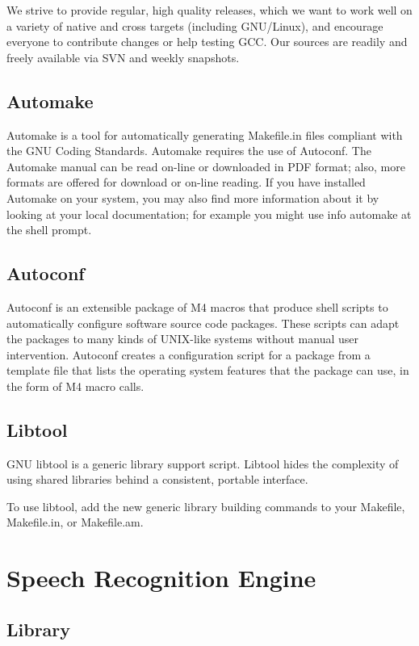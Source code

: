 \documentclass[12pt,a4paper,oldfontcommands]{memoir}
\begin{document}
We strive to provide regular, high quality releases, which we want to work well on a variety of native and cross targets (including GNU/Linux), and encourage everyone to contribute changes or help testing GCC. Our sources are readily and freely available via SVN and weekly snapshots\cite{27}.

\subsection{Automake} 
Automake is a tool for automatically generating Makefile.in files compliant with the GNU Coding Standards. Automake requires the use of Autoconf\cite{31}. The Automake manual can be read on-line or downloaded in PDF format; also, more formats are offered for download or on-line reading. If you have installed Automake on your system, you may also find more information about it by looking at your local documentation; for example you might use info automake at the shell prompt\cite{27}. 
 
\subsection{Autoconf}
Autoconf is an extensible package of M4 macros that produce shell scripts to automatically configure software source code packages. These scripts can adapt the packages to many kinds of UNIX-like systems without manual user intervention. Autoconf creates a configuration script for a package from a template file that lists the operating system features that the package can use, in the form of M4 macro calls\cite{28}.

\subsection{Libtool}
 GNU libtool is a generic library support script. Libtool hides the complexity of using shared libraries behind a consistent, portable interface.

To use libtool, add the new generic library building commands to your Makefile, Makefile.in, or Makefile.am\cite{28}.




\section{Speech Recognition Engine}
\subsection{Library}
\end{document}
